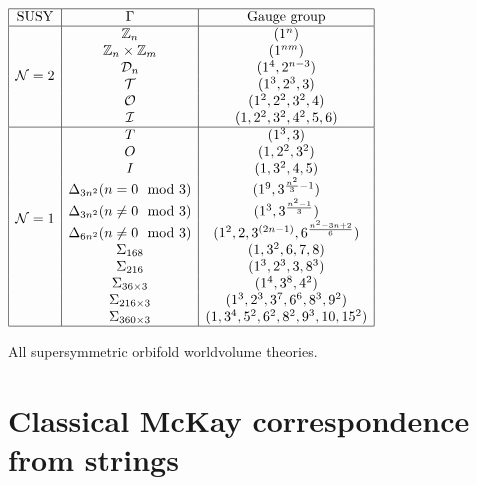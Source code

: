     \begin{table}[H]
        \centering
        $
        \begin{array}{|c|c|c|}
            \hline
            \text{SUSY} & \Gamma & \text{Gauge group} \\ \hline
            \multirow{6}{*}{$\mN=2$} & \Z_{n} & (1^n) \\
            & \Z_{n}\times\Z_m & (1^{nm}) \\
            & \D_{n} & (1^4,2^{n-3}) \\
            & \mathcal{T} & (1^3,2^3,3) \\
            & \mathcal{O} & (1^2,2^2,3^2,4) \\
            & \mathcal{I} & (1,2^2,3^2,4^2,5,6) \\ \hline
            \multirow{11}{*}{$\mN=1$} & T & (1^3,3) \\
            & O & (1,2^2,3^2) \\
            & I & (1,3^2,4,5) \\
            & \Delta_{3n^2} (n=0\mod 3) & (1^9,3^{\frac{n^2}{3}-1}) \\
            & \Delta_{3n^2} (n\neq0\mod 3) & (1^3,3^{\frac{n^2-1}{3}}) \\
            & \Delta_{6n^2} (n\neq0\mod 3) & (1^2,2,3^{(2n-1)},6^{\frac{n^2-3n+2}{6}}) \\
            & \Sigma_{168} & (1,3^2,6,7,8) \\
            & \Sigma_{216} & (1^3,2^3,3,8^3) \\
            & \Sigma_{36\times 3} & (1^4,3^8,4^2) \\
            & \Sigma_{216\times 3} & (1^3,2^3,3^7,6^6,8^3,9^2) \\
            & \Sigma_{360\times 3} & (1,3^4,5^2,6^2,8^2,9^3,10,15^2) \\ \hline
        \end{array}
        $
        \caption{All supersymmetric orbifold worldvolume theories.}
    \end{table}


\section{Classical McKay correspondence from strings}

